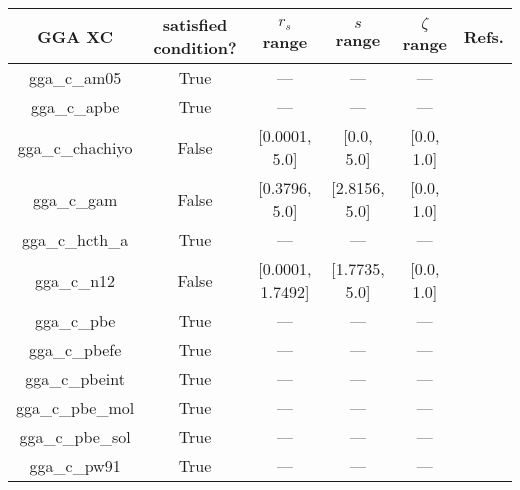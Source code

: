\begin{tabular}{|c|c|c|c|c|l|}
\hline
          GGA XC &  satisfied condition? &      $r_s$ range &     $s$ range & $\zeta$ range  &                                                 Refs. \\ \hline
    gga\_c\_am05 &                  True &              --- &           --- &            --- &        \cite{Armiento2005_085108,Mattsson2008_084714} \\ \hline
    gga\_c\_apbe &                  True &              --- &           --- &            --- &                          \cite{Constantin2011_186406} \\ \hline
gga\_c\_chachiyo &                 False &    [0.0001, 5.0] &    [0.0, 5.0] &     [0.0, 1.0] &                            \cite{Chachiyo2020_112669} \\ \hline
     gga\_c\_gam &                 False &    [0.3796, 5.0] & [2.8156, 5.0] &     [0.0, 1.0] &                                   \cite{Yu2015_12146} \\ \hline
 gga\_c\_hcth\_a &                  True &              --- &           --- &            --- &                             \cite{Hamprecht1998_6264} \\ \hline
     gga\_c\_n12 &                 False & [0.0001, 1.7492] & [1.7735, 5.0] &     [0.0, 1.0] &                              \cite{Peverati2012_2310} \\ \hline
     gga\_c\_pbe &                  True &              --- &           --- &            --- &            \cite{Perdew1996_3865,Perdew1996_3865_err} \\ \hline
   gga\_c\_pbefe &                  True &              --- &           --- &            --- &                                 \cite{Perez2015_3844} \\ \hline
  gga\_c\_pbeint &                  True &              --- &           --- &            --- &                             \cite{Fabiano2010_113104} \\ \hline
gga\_c\_pbe\_mol &                  True &              --- &           --- &            --- &                            \cite{delCampo2012_104108} \\ \hline
gga\_c\_pbe\_sol &                  True &              --- &           --- &            --- &                              \cite{Perdew2008_136406} \\ \hline
    gga\_c\_pw91 &                  True &              --- &           --- &            --- & \cite{Perdew1991,Perdew1992_6671,Perdew1992_6671_err} \\ \hline

\end{tabular}

